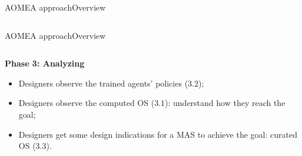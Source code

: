 \begin{frame}{AOMEA approach}{Overview}
\begin{columns}
    \end{columns}


\end{frame}

\begin{frame}{AOMEA approach}{Overview}

    \begin{columns}

        \begin{column}{0.6\textwidth}

            \textbf{Phase 3: Analyzing}

            \begin{itemize}
                \item Designers observe the trained agents' policies ($3.2$);
                \item Designers observe the computed OS ($3.1$): understand how they reach the goal;
                \item Designers get some design indications for a MAS to achieve the goal: curated OS ($3.3$).
            \end{itemize}


        \end{column}


\end{columns}
\end{frame}

